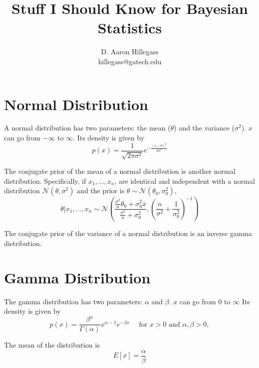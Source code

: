 \documentclass[12pt]{article}
\begin{document}
\title{Stuff I Should Know for Bayesian Statistics}
\author{D. Aaron Hillegass \\hillegass@gatech.edu}
\maketitle

\section*{Normal Distribution}

A normal distribution has two parameters: the mean ($\theta$) and the variance ($\sigma^2$). $x$ can go from $-\infty$ to $\infty$. Its density is given by
\begin{equation*}
p(x) = \frac{1}{\sqrt{2\pi\sigma^2}} e^{-\frac{(x - \theta)^2}{2\sigma^2}}
\end{equation*}


The conjugate prior of the mean of a normal distribution is another normal distribution. Specifically, if $x_1, \dots, x_n$, are identical and independent with a normal distribution $\mathcal{N}(\theta, \sigma^2)$ and the prior is $\theta \sim  \mathcal{N}(\theta_0, \sigma_0^2)$,
\begin{equation*}
\theta | x_1,\ldots,x_n \sim \mathcal{N}\left( \frac{\frac{\sigma^2}{n}\theta_0 + \sigma_0^2\bar{x}}{\frac{\sigma^2}{n}+\sigma_0^2},\left( \frac{n}{\sigma^2} + \frac{1}{\sigma_0^2} \right)^{-1} \right)
\end{equation*}

The conjugate prior of the variance of a normal distribution is an inverse gamma distribution.

\section*{Gamma Distribution}

The gamma distribution has two parameters: $\alpha$ and $\beta$. $x$ can go from $0$ to $\infty$ Its density is given by
\begin{equation*}
p(x) =   \frac{ \beta^\alpha}{\Gamma(\alpha)} x^{\alpha-1} e^{-\beta x} \quad \text{ for } x > 0 \text{ and } \alpha, \beta > 0,
\end{equation*}


The mean of the distribution is
\begin{equation*}
E[x] = \frac{ \alpha}{\beta}
\end{equation*}
\end{document}

